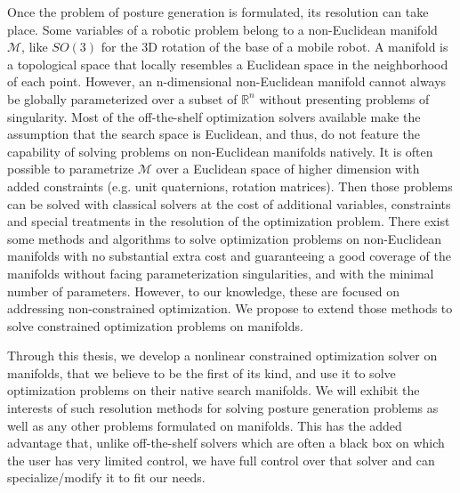 Once the problem of posture generation is formulated, its resolution can take place.
Some variables of a robotic problem belong to a non-Euclidean manifold $\mathcal{M}$, like $SO(3)$ for the 3D rotation of the base of a mobile robot.
A manifold is a topological space that locally resembles a Euclidean space in the neighborhood of each point.
However, an n-dimensional non-Euclidean manifold cannot always be globally parameterized over a subset of $\mathbb{R}^n$ without presenting problems of singularity.
Most of the off-the-shelf optimization solvers available make the assumption that the search space is Euclidean, and thus, do not feature the capability of solving problems on non-Euclidean manifolds natively.
It is often possible to parametrize $\mathcal{M}$ over a Euclidean space of higher dimension with added constraints (e.g. unit quaternions, rotation matrices).
Then those problems can be solved with classical solvers at the cost of additional variables, constraints and special treatments in the resolution of the optimization problem.
There exist some methods and algorithms to solve optimization problems on non-Euclidean manifolds with no substantial extra cost and guaranteeing a good coverage of the manifolds without facing parameterization singularities, and with the minimal number of parameters.
However, to our knowledge, these are focused on addressing non-constrained optimization.
We propose to extend those methods to solve constrained optimization problems on manifolds.

Through this thesis, we develop a nonlinear constrained optimization solver on manifolds, that we believe to be the first of its kind, and use it to solve optimization problems on their native search manifolds.
We will exhibit the interests of such resolution methods for solving posture generation problems as well as any other problems formulated on manifolds.
This has the added advantage that, unlike off-the-shelf solvers which are often a black box on which the user has very limited control, we have full control over that solver and can specialize/modify it to fit our needs.


